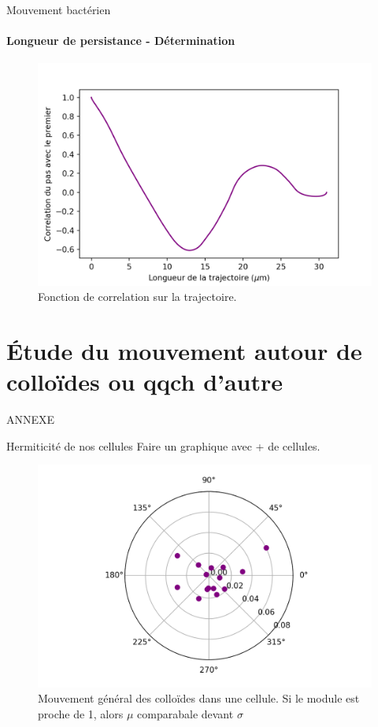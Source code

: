 \documentclass[11pt]{beamer}
\begin{document}
\begin{frame}{Mouvement bactérien}
\framesubtitle{Longueur de persistance - Détermination}
\begin{figure}
\includegraphics[width=0.9\linewidth]{Correlation_bactery.png}
\caption{Fonction de correlation sur la trajectoire.}
\end{figure}
\end{frame}





\section{Étude du mouvement autour de colloïdes ou qqch d'autre}




\appendix
\begin{frame}
ANNEXE
\end{frame}
\begin{frame}{Hermiticité de nos cellules}
Faire un graphique avec + de cellules.
\begin{figure}
	\centering
	\includegraphics[width=0.8\linewidth]{FuitesNico_1}
	\caption{Mouvement général des colloïdes dans une cellule. Si le module est proche de 1, alors $\mu$ comparabale devant $\sigma$}
	\label{fig:fuitesnico1}
\end{figure}
\end{frame}
\end{document}
